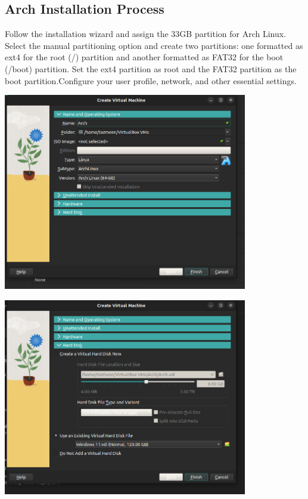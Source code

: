 \documentclass[a4paper]{article}
\begin{document}
\subsection{Arch Installation Process}
Follow the installation wizard and assign the 33GB partition for Arch Linux. 
Select the manual partitioning option and create two partitions: one formatted as ext4 for the root (/) partition and another formatted as FAT32 for the boot (/boot) partition. Set the ext4 partition as root and the FAT32 partition as the boot partition.Configure your user profile, network, and other essential settings.

\begin{center}
    \includegraphics[width=0.8\textwidth]{25.jpeg} %
\end{center}
\begin{center}
    \includegraphics[width=0.8\textwidth]{26.jpeg} %
\end{center}
\end{document}
